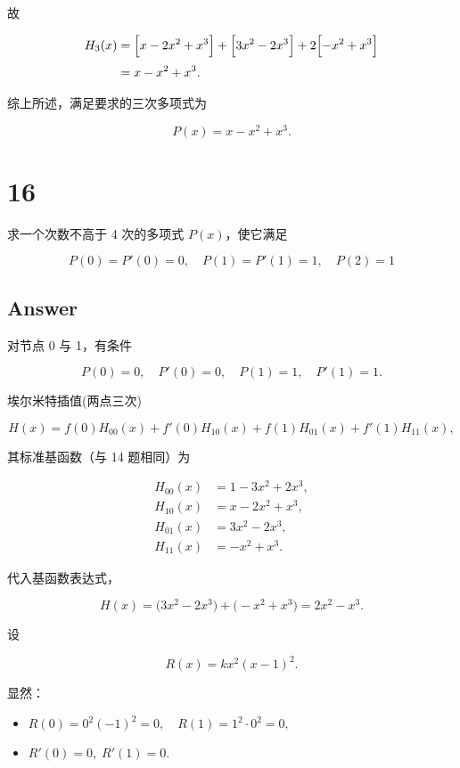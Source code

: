\documentclass[11pt]{article}
\providecommand{\tightlist}{%
      \setlength{\itemsep}{0pt}\setlength{\parskip}{0pt}}
\begin{document}
故

\[
\begin{aligned}
H_3(x) &= \Bigl[x-2x^2+x^3\Bigr] +
\Bigl[3x^2-2x^3\Bigr] + 2\Bigl[-x^2+x^3\Bigr]\\[1mm]
&= x - x^2 + x^3.
\end{aligned}
\]

综上所述，满足要求的三次多项式为

\[
\boxed{P(x)= x - x^2 + x^3.}
\]

    \section{16}\label{section}

求一个次数不高于 4 次的多项式 \(P(x)\)，使它满足

\[
P(0) = P'(0) = 0, \quad P(1) = P'(1) = 1, \quad P(2) = 1
\]

\subsection{Answer}\label{answer}

对节点 0 与 1，有条件

\[
P(0)=0,\quad P'(0)=0,\quad P(1)=1,\quad P'(1)=1.
\]

埃尔米特插值(两点三次)

\[
H(x)= f(0)H_{00}(x)+ f'(0)H_{10}(x)+ f(1)H_{01}(x)+ f'(1)H_{11}(x),
\]

其标准基函数（与 14 题相同）为

\[
\begin{aligned}
H_{00}(x)&= 1- 3x^2 + 2x^3,\\[1mm]
H_{10}(x)&= x- 2x^2 + x^3,\\[1mm]
H_{01}(x)&= 3x^2-2x^3,\\[1mm]
H_{11}(x)&= -x^2+ x^3.
\end{aligned}
\]

代入基函数表达式，

\[
H(x)= \bigl(3x^2-2x^3\bigr)+\bigl(-x^2+x^3\bigr)= 2x^2-x^3.
\]

设

\[
R(x) = kx^2 (x-1)^2.
\]

显然：

\begin{itemize}
\tightlist
\item
  \(R(0)=0^2( -1)^2=0,\quad R(1)=1^2\cdot 0^2=0,\)
\item
  \(R'(0)=0,\; R'(1)=0.\)
\end{itemize}
\end{document}
